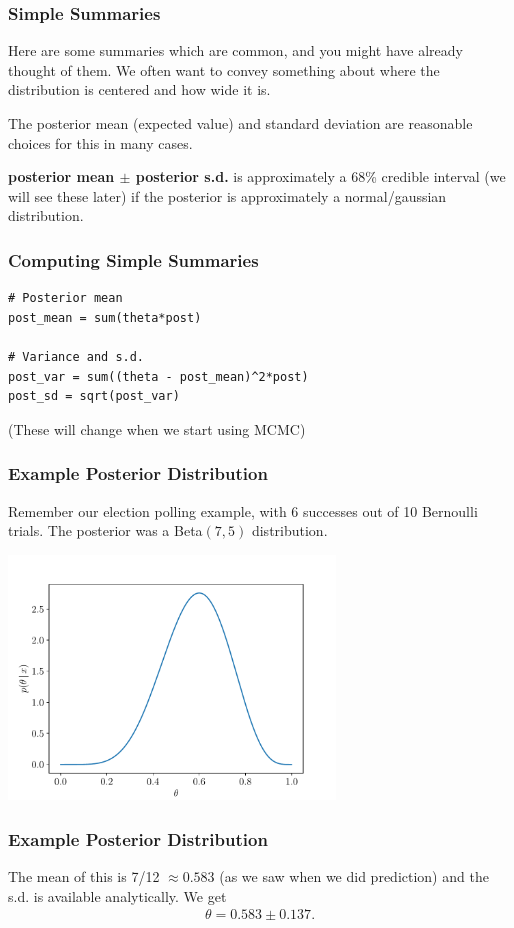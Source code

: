 \documentclass{beamer}
\begin{document}
\begin{frame}
\frametitle{Simple Summaries}
Here are some summaries which are common, and you might have already thought
of them. We often want to convey something about where the distribution is
centered and how wide it is.\pause

The posterior mean (expected value) and standard deviation are reasonable
choices for this in many cases.\pause

{\bf posterior mean $\pm$ posterior s.d.}
is approximately a 68\% credible interval
(we will see these later) if the posterior is approximately a normal/gaussian
distribution.

\end{frame}

\begin{frame}[fragile]
\frametitle{Computing Simple Summaries}
\begin{verbatim}
# Posterior mean
post_mean = sum(theta*post)

# Variance and s.d.
post_var = sum((theta - post_mean)^2*post)
post_sd = sqrt(post_var)
\end{verbatim}
(These will change when we start using MCMC)

\end{frame}


\begin{frame}[fragile]
\frametitle{Example Posterior Distribution}
Remember our election polling example, with 6 successes out of 10 Bernoulli
trials. The posterior was a Beta$(7, 5)$ distribution.

\begin{center}
\includegraphics[width=0.65\textwidth]{images/beta_posterior.pdf}
\end{center}

\end{frame}


\begin{frame}[fragile]
\frametitle{Example Posterior Distribution}

The mean of this is 7/12 $\approx 0.583$ (as we saw when we did prediction)
and the s.d. is available analytically. We get
\begin{align}
\theta = 0.583 \pm 0.137.
\end{align}


\end{frame}
\end{document}
